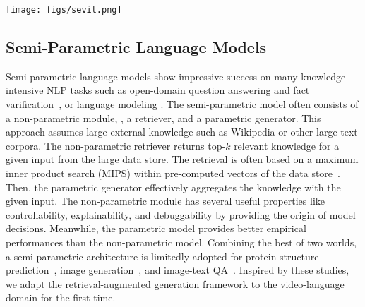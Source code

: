 \documentclass{article}
\newcommand{\frameworkname}{SeViT}
\begin{document}
\begin{figure*}[t!] 
\centering
\texttt{[image: figs/sevit.png]}
\caption{Detailed illustration for mechanism of \frameworkname{}. 1) It first retrieves top-$k$ query-relevant frames from a video via maximum inner product search (MIPS) between a query vector and (pre-computed) $|V|$ frame vectors, where $k \ll |V|$. 2) Each frame is encoded with the query $q$ independently by the encoder of VGT-Generator. It produces $k$ query-aware representations. 3) We explore two late fusion methods, 3-(a) Marginalization~\cite{lewis2020retrieval} and 3-(b) Fusion-in-Decoder~\cite{izacard2021leveraging} to produce the final output $\hat{a}$ by aggregating the $k$ query-aware frames in the decoder.}
\label{fig:overview}
\end{figure*}

\subsection{Semi-Parametric Language Models}

Semi-parametric language models show impressive success on many knowledge-intensive NLP tasks such as open-domain question answering and fact varification~\cite{guu2020retrieval, lewis2020retrieval, izacard2021leveraging, izacard2022few}, or language modeling \cite{khandelwal2019generalization, borgeaud2021improving}. The semi-parametric model often consists of a non-parametric module, \ie, a retriever, and a parametric generator. This approach assumes large external knowledge such as Wikipedia or other large text corpora. The non-parametric retriever returns top-$k$ relevant knowledge for a given input from the large data store. The retrieval is often based on a maximum inner product search (MIPS) within pre-computed vectors of the data store~\cite{johnson2019billion}. Then, the parametric generator effectively aggregates the knowledge with the given input. The non-parametric module has several useful properties like controllability, explainability, and debuggability by providing the origin of model decisions. Meanwhile, the parametric model provides better empirical performances than the non-parametric model. Combining the best of two worlds, a semi-parametric architecture is limitedly adopted for protein structure prediction~\cite{jumper2021highly}, image generation~\cite{blattmann2022semi}, and image-text QA~\cite{chen2022murag, lin2022retrieval}. Inspired by these studies, we adapt the retrieval-augmented generation framework to the video-language domain for the first time.
\end{document}
